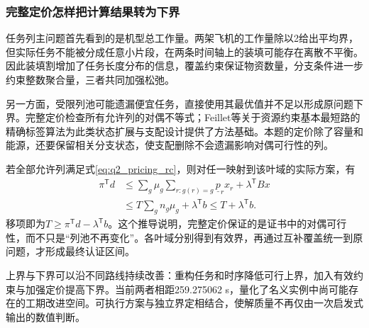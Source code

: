 \subsubsection{完整定价怎样把计算结果转为下界}
任务列主问题首先看到的是机型总工作量。两架飞机的工作量除以2给出平均界，但实际任务不能被分成任意小片段，在两条时间轴上的装填可能存在离散不平衡。因此装填割增加了任务长度分布的信息，覆盖约束保证物资数量，分支条件进一步约束整数聚合量，三者共同加强松弛。

另一方面，受限列池可能遗漏便宜任务，直接使用其最优值并不足以形成原问题下界。完整定价检查所有允许列的对偶不等式；Feillet等关于资源约束基本最短路的精确标签算法为此类状态扩展与支配设计提供了方法基础\cite{feillet2004}。本题的定价除了容量和能源，还要保留相关分支状态，使支配删除不会遗漏影响对偶可行性的列。

若全部允许列满足式\eqref{eq:q2_pricing_rc}，则对任一映射到该叶域的实际方案，有
\begin{equation}
\begin{aligned}
 \pi^{\mathsf T}d
 &\le\sum_g\mu_g\sum_{r:g(r)=g}\underline p_rx_r+\lambda^{\mathsf T}Bx\\
 &\le T\sum_gn_g\mu_g+\lambda^{\mathsf T}b
 \le T+\lambda^{\mathsf T}b.
\end{aligned}
\label{eq:q2_weak_dual_chain}
\end{equation}
移项即为$T\ge\pi^{\mathsf T}d-\lambda^{\mathsf T}b$。这个推导说明，完整定价保证的是证书中的对偶可行性，而不只是“列池不再变化”。各叶域分别得到有效界，再通过互补覆盖统一到原问题，才形成最终认证区间。

上界与下界可以沿不同路线持续改善：重构任务和时序降低可行上界，加入有效约束与加强定价提高下界。当前两者相距259.275062 s，量化了名义实例中尚可能存在的工期改进空间。可执行方案与独立界定相结合，使解质量不再仅由一次启发式输出的数值判断。
